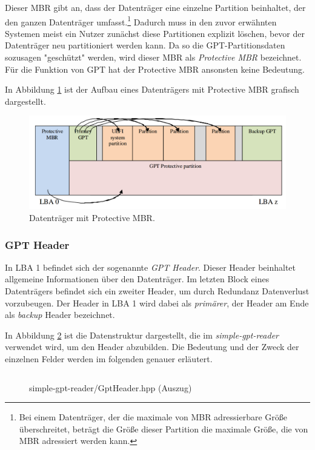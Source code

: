 Dieser MBR gibt an, dass der Datenträger eine einzelne Partition beinhaltet, der den ganzen Datenträger umfasst.\footnote{
    Bei einem Datenträger, der die maximale von MBR adressierbare Größe überschreitet, beträgt die Größe dieser Partition die maximale Größe, die von MBR adressiert werden kann.
}
Dadurch muss in den zuvor erwähnten Systemen meist ein Nutzer zunächst diese Partitionen explizit löschen, bevor der Datenträger neu partitioniert werden kann.
Da so die GPT-Partitionsdaten sozusagen "geschützt" werden, wird dieser MBR als \textit{Protective MBR} bezeichnet.
Für die Funktion von GPT hat der Protective MBR ansonsten keine Bedeutung.

In Abbildung \ref{fig:protective-mbr} ist der Aufbau eines Datenträgers mit Protective MBR grafisch dargestellt.

\begin{figure}[ht]
    \includegraphics[width=\textwidth]{content/graphics/GPT_Layout_with_protective_MBR.png}
    
    \caption{Datenträger mit Protective MBR. \cite{uefi-spec}}
    \label{fig:protective-mbr}
\end{figure}


\subsubsection{GPT Header}
In LBA 1 befindet sich der sogenannte \textit{GPT Header}.
Dieser Header beinhaltet allgemeine Informationen über den Datenträger.
Im letzten Block eines Datenträgers befindet sich ein zweiter Header, um durch Redundanz Datenverlust vorzubeugen.
Der Header in LBA 1 wird dabei als \textit{primärer}, der Header am Ende als \textit{backup} Header bezeichnet.

In Abbildung \ref{fig:GptHeader.hpp} ist die Datenstruktur dargestellt, die im \textit{simple-gpt-reader} verwendet wird, um den Header abzubilden.
Die Bedeutung und der Zweck der einzelnen Felder werden im folgenden genauer erläutert.

\begin{figure}[ht]
    \inputminted[baselinestretch=1.2, linenos, tabsize=4, breaklines, frame=single]{c++}{content/code/simple-gpt-reader/GptHeader.hpp}
    
    \caption{simple-gpt-reader/GptHeader.hpp (Auszug)}
    \label{fig:GptHeader.hpp}
\end{figure}

